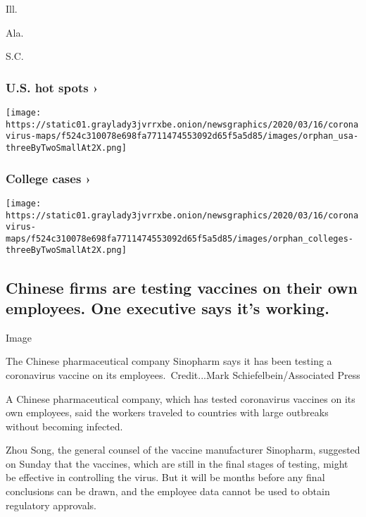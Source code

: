 Ill.
\href{https://www.nytimes3xbfgragh.onion/interactive/2020/us/alabama-coronavirus-cases.html}{}

Ala.
\href{https://www.nytimes3xbfgragh.onion/interactive/2020/us/south-carolina-coronavirus-cases.html}{}

S.C.

\href{https://www.nytimes3xbfgragh.onion/interactive/2020/us/coronavirus-us-cases.html}{}

\hypertarget{us-hot-spots-}{%
\subsubsection{U.S. hot spots ›}\label{us-hot-spots-}}

\texttt{[image: https://static01.graylady3jvrrxbe.onion/newsgraphics/2020/03/16/coronavirus-maps/f524c310078e698fa7711474553092d65f5a5d85/images/orphan\_usa-threeByTwoSmallAt2X.png]}
\href{https://www.nytimes3xbfgragh.onion/interactive/2020/07/28/us/covid-19-colleges-universities.html}{}

\hypertarget{college-cases-}{%
\subsubsection{College cases ›}\label{college-cases-}}

\texttt{[image: https://static01.graylady3jvrrxbe.onion/newsgraphics/2020/03/16/coronavirus-maps/f524c310078e698fa7711474553092d65f5a5d85/images/orphan\_colleges-threeByTwoSmallAt2X.png]}

\hypertarget{chinese-firms-are-testing-vaccines-on-their-own-employees-one-executive-says-its-working}{%
\subsection{Chinese firms are testing vaccines on their own employees.
One executive says it's
working.}\label{chinese-firms-are-testing-vaccines-on-their-own-employees-one-executive-says-its-working}}

Image

The Chinese pharmaceutical company Sinopharm says it has been testing a
coronavirus vaccine on its employees.~Credit...Mark
Schiefelbein/Associated Press

A Chinese pharmaceutical company, which has tested coronavirus vaccines
on its own employees, said the workers traveled to countries with large
outbreaks without becoming infected.

Zhou Song, the general counsel of the vaccine manufacturer Sinopharm,
suggested on Sunday that the vaccines, which are still in the final
stages of testing, might be effective in controlling the virus. But it
will be months before any final conclusions can be drawn, and the
employee data cannot be used to obtain regulatory approvals.

